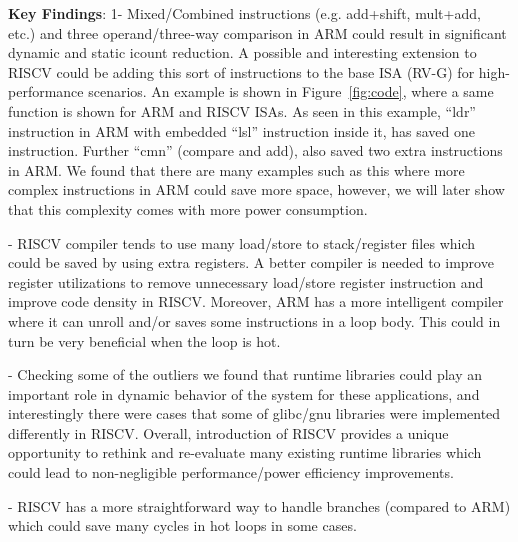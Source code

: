 \noindent \textbf{Key Findings}: 1- Mixed/Combined instructions (e.g. add+shift, mult+add, etc.) and three operand/three-way comparison in ARM could result in significant dynamic and static icount reduction. A possible and interesting extension to RISCV could be adding this sort of instructions to the base ISA (RV-G) for high-performance scenarios. An example is shown in Figure~\ref{fig:code}, where a same function is shown for ARM and RISCV ISAs. As seen in this example, ``ldr'' instruction in ARM with embedded ``lsl'' instruction inside it, has saved one instruction. Further ``cmn'' (compare and add), also saved two extra instructions in ARM. We found that there are many examples such as this where more complex instructions in ARM could save more space, however, we will later show that this complexity comes with more power consumption. 

- RISCV compiler tends to use many load/store to stack/register files which could be saved by using extra registers. A better compiler is needed to improve register utilizations to remove unnecessary load/store register instruction and improve code density in RISCV. Moreover, ARM has a more intelligent compiler where it can unroll and/or saves some instructions in a loop body. This could in turn be very beneficial when the loop is hot. 

- Checking some of the outliers we found that runtime libraries could play an important role in dynamic behavior of the system for these applications, and interestingly there were cases that some of glibc/gnu libraries were implemented differently in RISCV. Overall, introduction of RISCV provides a unique opportunity to rethink and re-evaluate many existing runtime libraries which could lead to non-negligible performance/power efficiency improvements. 

- RISCV has a more straightforward way to handle branches (compared to ARM) which could save many cycles in hot loops in some cases. 
\\





